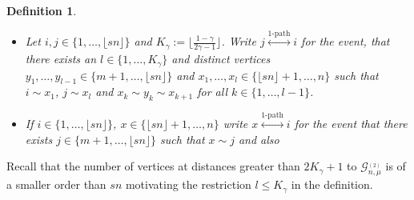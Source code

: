 \documentclass[12pt,a4paper]{article}
\numberwithin{equation}{section}
\newtheorem{definition}[shared]{Definition}
\begin{document}
\begin{definition}\label{1path}\text{}\\[-5mm]
\begin{itemize}
\item    
    \emph{Let $i,j\in\{1,\dots,\lfloor sn \rfloor\}$ and $K_\gamma:=\lfloor\tfrac{1-\gamma}{2\gamma-1}\big\rfloor$. Write $j\overset{1\text{-path}}{\longleftrightarrow}i$} for the event, that there exists an $l\in\{1,\dots, K_\gamma\}$ and distinct vertices $y_1,\dots,y_{l-1}\in\{m+1,\dots,\lfloor sn\rfloor\}$ and $x_1,\dots,x_{l}\in\{\lfloor sn\rfloor+1,\dots,n\}$ such that $i \sim x_1$, $j\sim x_{l}$ and $x_{k} \sim y_k \sim x_{k+1}$ for all $k\in\{1,\dots,l-1\}$. 
\item \emph{If  $i\in\{1,\ldots, \lfloor sn\rfloor\}$, $x\in\{\lfloor sn\rfloor+1,\dots,n\}$ write $x\overset{1\text{-path}}{\longleftrightarrow}i$ for the event that there exists  $j\in\{m+1,\dots,\lfloor sn\rfloor\}$ such that $x\sim j$ and also }
\end{itemize}
\end{definition}

\noindent Recall that the number of vertices at distances greater than $2K_\gamma+1$ to $\mathcal G^{_{(2)}}_{n,\mu}$ is of a smaller order than $sn$ motivating the restriction $l\leq K_\gamma$ in the definition.
\pagebreak[3]
\end{document}
